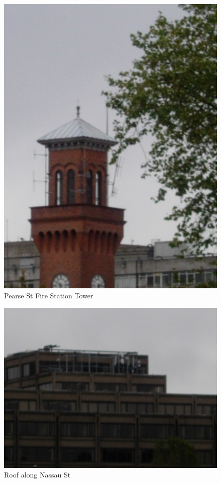 \documentclass[a4paper,12pt]{article}
\begin{document}
\begin{figure}[h]

\includegraphics{1.png}

\caption{Pearse St Fire Station Tower}

\end{figure}

\begin{figure}[h]

\includegraphics{2.png}

\caption{Roof along Nassau St}

\end{figure}
\end{document}
